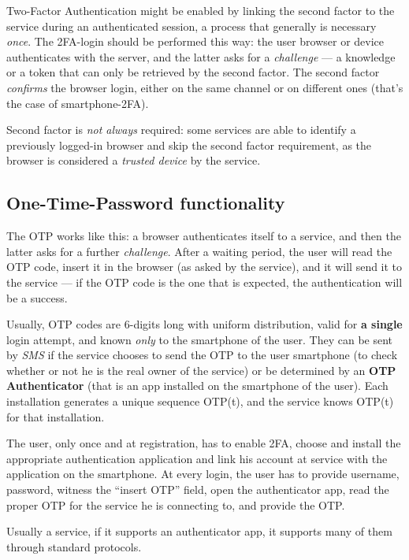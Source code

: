 \documentclass[10pt]{\classname}
\begin{document}
Two\--Factor Authentication might be enabled by linking the second factor to
the service during an authenticated session, a process that generally is
necessary \emph{once}. The 2FA\--login should be performed this way: the user
browser or device authenticates with the server, and the latter asks for a
\emph{challenge} --- a knowledge or a token that can only be retrieved by the
second factor. The second factor \emph{confirms} the browser login, either on
the same channel or on different ones (that's the case of smartphone\--2FA).

Second factor is \emph{not always} required: some services are able to identify
a previously logged\--in browser and skip the second factor requirement, as the
browser is considered a \emph{trusted device} by the service.

\subsection{One\--Time\--Password functionality}

The OTP works like this: a browser authenticates itself to a service, and then
the latter asks for a further \emph{challenge}. After a waiting period, the
user will read the OTP code, insert it in the browser (as asked by the
service), and it will send it to the service --- if the OTP code is the one that
is expected, the authentication will be a success.

Usually, OTP codes are 6\--digits long with uniform distribution, valid for
\textbf{a single} login attempt, and known \emph{only} to the smartphone of the
user. They can be sent by \emph{SMS} if the service chooses to send the OTP to
the user smartphone (to check whether or not he is the real owner of the
service) or be determined by an \textbf{OTP Authenticator} (that is an app
installed on the smartphone of the user). Each installation generates a unique
sequence OTP(t), and the service knows OTP(t) for that installation.

The user, only once and at registration, has to enable 2FA, choose and install
the appropriate authentication application and link his account at service with
the application on the smartphone. At every login, the user has to provide
username, password, witness the ``insert OTP'' field, open the authenticator
app, read the proper OTP for the service he is connecting to, and provide the
OTP.

Usually a service, if it supports an authenticator app, it supports many of
them through standard protocols. 
\end{document}
